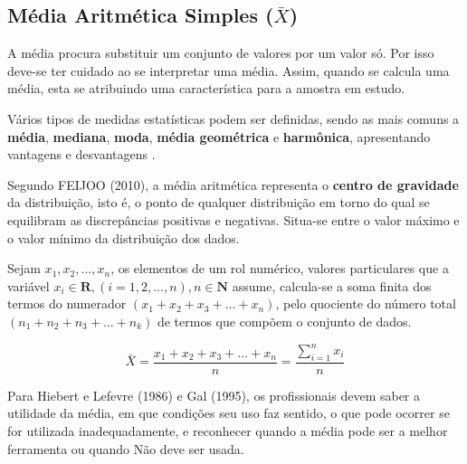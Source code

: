 \subsection{Média Aritmética Simples ($\bar{X}$)}

A média procura substituir um conjunto de valores por um valor só. Por isso
deve-se ter cuidado ao se interpretar uma média. Assim, quando se calcula uma média, esta se atribuindo
uma característica para a amostra em estudo.\vskip0.3cm

Vários tipos de medidas estatísticas podem ser definidas, sendo as mais comuns a \textbf{média}, \textbf{mediana}, \textbf{moda}, \textbf{média geométrica} e \textbf{harmônica}, apresentando vantagens e desvantagens
.\vskip0.3cm

Segundo FEIJOO (2010), a média aritmética representa o \textbf{centro de gravidade} da
distribuição, isto é, o ponto de qualquer distribuição em torno do qual se
equilibram as discrepâncias positivas e negativas. Situa-se entre o valor máximo e o valor mínimo da distribuição dos dados.\vskip0.3cm






Sejam $x_{1}, x_{2}, ..., x_{n}$, os elementos de um rol numérico, valores particulares que a variável $x_{i} \in \mathbf{R}, (i=1,2,...,n), n \in \mathbf{N} $ assume, calcula-se a soma finita dos termos do numerador $(x_{1}+x_{2}+x_{3}+\ldots+x_{n})$,  pelo quociente do número total $(n_{1}+n_{2}+n_{3}+\ldots+n_{k})$ de termos que compõem o conjunto de dados.\vskip0.3cm


\begin{equation}\label{media1}
\bar{X}=\frac{x_{1}+x_{2}+x_{3}+\ldots+x_{n}}{n}= \frac{\sum_{i=1}^{n}x_{i}}{n}
\end{equation}


Para Hiebert e Lefevre (1986) e Gal (1995), os profissionais devem saber a utilidade da média, em que condições seu uso faz sentido, o que pode ocorrer se for utilizada inadequadamente, e reconhecer quando a média pode ser a melhor ferramenta ou quando Não deve ser usada.





